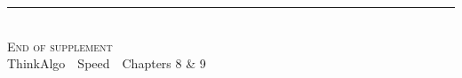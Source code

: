 \documentclass[12pt,a4paper]{article}
\begin{document}
\clearpage
\thispagestyle{empty}
\vspace*{\fill}
\begin{center}
{\color{Navy!30}\rule{0.5\linewidth}{0.6pt}}\\[8pt]
{\scshape\color{DarkNavy}End of supplement}\\[4pt]
{\footnotesize\color{Ink}ThinkAlgo \,\textbullet\, Speed \,\textbullet\, Chapters 8 \& 9}\\[2pt]
{\footnotesize\color{LightNavy}\EDITION}
\end{center}
\vspace*{\fill}
\end{document}
